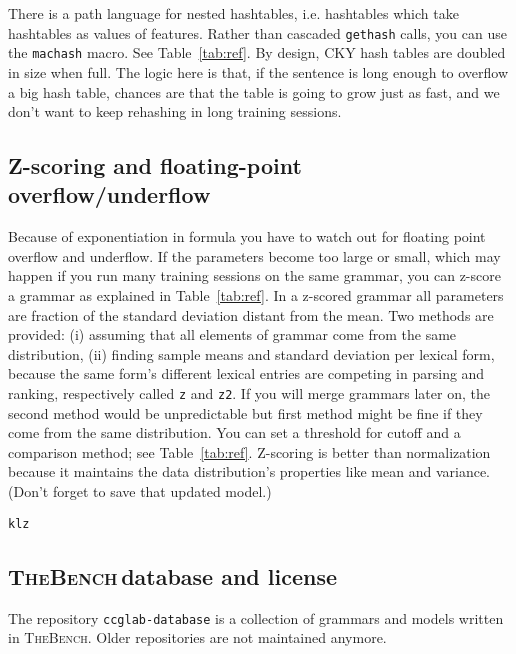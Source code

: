\documentclass[11pt]{article}
\newcommand{\tool}{\textsc{TheBench}}
\begin{document}
{{{{{There is a path language for nested hashtables, i.e. hashtables which take hashtables as values of features. Rather than cascaded} \verb|gethash| {calls, you can use
the} \verb|machash| {macro. See Table~\ref{tab:ref}.} {By design, CKY hash tables are doubled in size when full.
The logic here is that, if the sentence is long enough to overflow a big hash table, chances are that the table is going to grow just as fast, and we don't
want to keep rehashing in long training sessions.}

\subsection{Z-scoring and floating-point overflow/underflow} 
{Because of exponentiation in formula you have to watch out for floating point overflow and underflow. If the parameters become too large or small, which may happen if you run many training sessions on the same grammar,
you can z-score a grammar as explained in Table~\ref{tab:ref}.
In a z-scored grammar all parameters are fraction of the standard deviation distant from the mean. {Two methods are provided: (i) assuming 
that all elements of grammar come from the same distribution, (ii) finding sample means and standard deviation per lexical form, because the same form's
different lexical entries are competing in parsing and ranking}, respectively called 
\verb|z| and \verb|z2|. {If you will merge grammars later on, the second
method would be unpredictable but first method might be fine
if they come from the same distribution}.
{You can set a threshold for cutoff and a comparison method; see Table~\ref{tab:ref}.}
Z-scoring is better than normalization because it maintains the data distribution's properties like mean and variance. (Don't forget to
save that updated model.)} 

 \verb|klz| 

\subsection{\tool\,database and license}
The repository \verb+ccglab-database+ is a collection of grammars and models written in \tool. {Older repositories are not maintained anymore.}

}}}}
\end{document}
